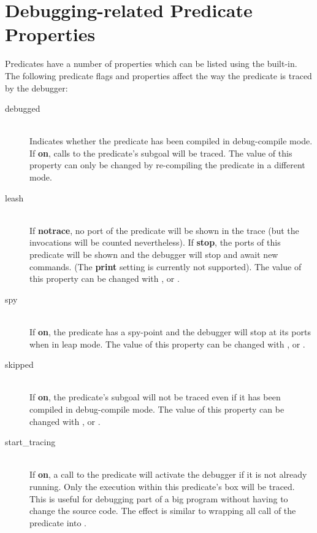 \section{Debugging-related Predicate Properties}

Predicates have a number of properties which can be listed using the
 built-in.
The following predicate flags and properties affect the way the
predicate is traced by the debugger:
\begin{description}
\item[debugged]\ \\
        Indicates whether the predicate has been compiled in debug-compile mode.
        If {\bf on}, calls to the predicate's subgoal will be traced.
        The value of this property can only be changed by re-compiling
        the predicate in a different mode.

\item[leash]\ \\
        If {\bf notrace}, no port of the predicate will be shown
        in the trace (but the invocations will be counted nevertheless).
        If {\bf stop}, the ports of this predicate will be shown and
        the debugger will stop and await new commands.
        (The {\bf print} setting is currently not supported).
        The value of this property can be changed with
        ,
         or
        .

\item[spy]\ \\
        If {\bf on}, the predicate has a spy-point and the debugger will
        stop at its ports when in leap mode.
        The value of this property can be changed with
        ,
         or
        .
        
\item[skipped]\ \\
        If {\bf on}, the predicate's subgoal will not be traced even
        if it has been compiled in debug-compile mode.
        The value of this property can be changed with
        ,
         or
        .

\item[start_tracing]\ \\
        If {\bf on}, a call to the predicate will activate the debugger if it
        is not already running.
        Only the execution within this predicate's box will be traced.
        This is useful for debugging part of a big
        program without having to change the source code.
        The effect is similar to wrapping all call of the predicate into
        .
\end{description}


